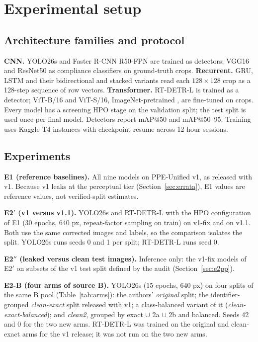\documentclass[review,12pt]{elsarticle}
\newcommand{\inputfloat}[2]{{\renewenvironment{table*}[1][]
  {\begin{table}[#1]}{\end{table}}#2}}
\begin{document}
\inputfloat{tp}{}

\section{Experimental setup}
\label{sec:experiments}

\subsection{Architecture families and protocol}
\textbf{CNN.} YOLO26s \citep{ultralytics_yolo26} and Faster R-CNN
R50-FPN \citep{ren2015faster} are trained as detectors; VGG16 and
ResNet50 as compliance classifiers on ground-truth crops.
\textbf{Recurrent.} GRU, LSTM and their bidirectional and stacked
variants read each $128\times128$ crop as a 128-step sequence of row
vectors. \textbf{Transformer.} RT-DETR-L \citep{zhao2024rtdetr} is
trained as a detector; ViT-B/16 and ViT-S/16, ImageNet-pretrained
\citep{deng2009imagenet}, are fine-tuned on crops. Every model has a
screening HPO stage on the validation split; the test split is used
once per final model. Detectors report mAP@50 and mAP@50--95.
Training uses Kaggle T4 instances with checkpoint-resume across
12-hour sessions.

\subsection{Experiments}
\label{sec:e-list}
\textbf{E1 (reference baselines).} All nine models on PPE-Unified v1,
as released with v1. Because v1 leaks at the
perceptual tier (Section~\ref{sec:errata}), E1 values are reference
values, not verified-split estimates.

\textbf{E2$'$ (v1 versus v1.1).} YOLO26s and RT-DETR-L with the HPO
configuration of E1 (30 epochs, $640$ px, repeat-factor sampling on
train) on v1-fix and on v1.1. Both use the same corrected images and
labels, so the comparison isolates the split. YOLO26s runs seeds 0
and 1 per split; RT-DETR-L runs seed 0.

\textbf{E2$''$ (leaked versus clean test images).} Inference only: the
v1-fix models of E2$'$ on subsets of the v1 test split defined by the
audit (Section~\ref{sec:e2pp}).

\textbf{E2-B (four arms of source B).} YOLO26s (15
epochs, $640$ px) on four splits of the same B pool
(Table~\ref{tab:arms}): the authors' \emph{original} split; the
identifier-grouped \emph{clean-exact} split released with v1; a
class-balanced variant of it (\emph{clean-exact-balanced}); and
\emph{clean2}, grouped by exact $\cup$ 2a $\cup$ 2b and balanced.
Seeds 42 and 0 for the two new arms. RT-DETR-L was trained on the
original and clean-exact arms for the v1 release; it was not run on
the two new arms.
\end{document}
